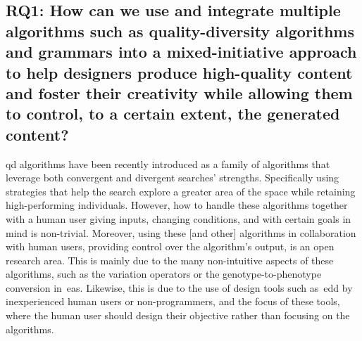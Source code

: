 
\subsection[Research Question 1]{RQ1: How can we use and integrate multiple algorithms such as quality-diversity algorithms and grammars into a mixed-initiative approach to help designers produce high-quality content and foster their creativity while allowing them to control, to a certain extent, the generated content?}


\acrshort{qd} algorithms have been recently introduced as a family of algorithms that leverage both convergent and divergent searches' strengths. Specifically using strategies that help the search explore a greater area of the space while retaining high-performing individuals. However, how to handle these algorithms together with a human user giving inputs, changing conditions, and with certain goals in mind is non-trivial. Moreover, using these [and other] algorithms in collaboration with human users, providing control over the algorithm's output, is an open research area. This is mainly due to the many non-intuitive aspects of these algorithms, such as the variation operators or the genotype-to-phenotype conversion in~\acrlong{ea}s. Likewise, this is due to the use of design tools such as~\acrshort{edd} by inexperienced human users or non-programmers, and the focus of these tools, where the human user should design their objective rather than focusing on the algorithms.

